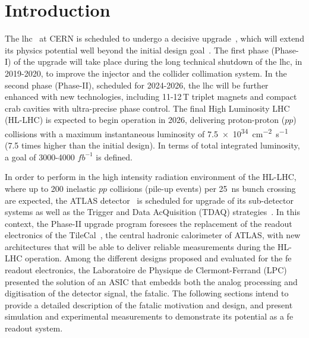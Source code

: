 \section{Introduction}
\label{sec:intro}

The \gls{lhc}~\cite{Evans:2008zzb} at CERN is scheduled to undergo a decisive upgrade~\cite{Apollinari:2015bam}, 
which will extend its physics potential well beyond the initial design goal~\cite{Jakobs:2011zz,Schmidt:2016jra}. 
The first phase (Phase-I) of the upgrade will take place during the long technical shutdown of the \gls{lhc}, in 
2019-2020, to improve the injector and the collider collimation system. In the second phase (Phase-II), scheduled 
for 2024-2026, the \gls{lhc} will be further enhanced with new technologies, including 11-12\,\si{T} triplet magnets 
and compact crab cavities with ultra-precise phase control. The final High Luminosity LHC (HL-LHC) is expected to 
begin operation in 2026, delivering proton-proton ($pp$) collisions with a maximum instantaneous luminosity of 
\SI{7.5e34}{cm^{-2}.s^{-1}} (7.5 times higher than the initial design). In terms of total integrated luminosity, 
a goal of 3000-4000 $\si{fb^{-1}}$ is defined.

In order to perform in the high intensity radiation environment of the HL-LHC, where up to 200 inelastic $pp$ collisions 
(pile-up events) per \SI{25}{ns} bunch crossing are expected, the ATLAS detector~\cite{PERF-2007-01} is
scheduled for upgrade of its sub-detector systems as well as the Trigger and Data AcQuisition (TDAQ) 
strategies~\cite{CERN-LHCC-2015-020}. In this context, the Phase-II upgrade program foresees the replacement of 
the readout electronics of the \gls{TileCal}~\cite{TCAL-2010-01,Collaboration:2285583}, the central hadronic 
calorimeter of ATLAS, with new architectures that will be able to deliver reliable measurements during the 
HL-LHC operation. Among the different designs proposed and evaluated for the \gls{fe} readout electronics, 
the Laboratoire de Physique de Clermont-Ferrand (LPC) presented the solution of an ASIC that embedds both
the analog processing and digitisation of the detector signal, the \gls{fatalic}. The following sections 
intend to provide a detailed description of the \gls{fatalic} motivation and design, and present simulation 
and experimental measurements to demonstrate its potential as a \gls{fe} readout system.

